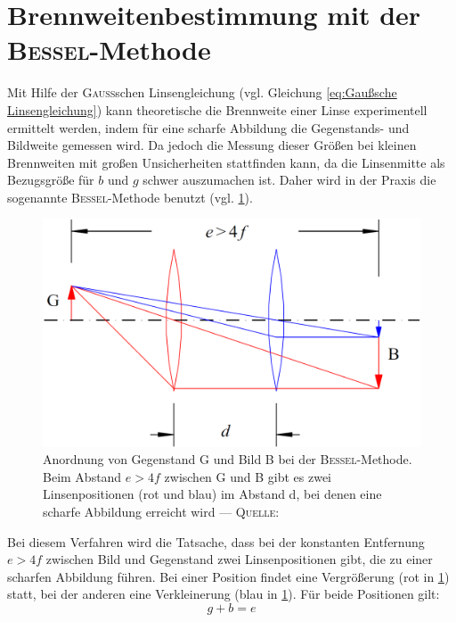 \documentclass[../protokoll.tex]{subfiles}
\begin{document}
\section{Brennweitenbestimmung mit der \textsc{Bessel}-Methode}
Mit Hilfe der \textsc{Gauß}schen Linsengleichung (vgl. Gleichung \eqref{eq:Gaußsche Linsengleichung})
kann theoretische die Brennweite einer Linse experimentell
ermittelt werden, indem für eine scharfe Abbildung die Gegenstands- und Bildweite
gemessen wird. Da jedoch die Messung dieser Größen bei kleinen Brennweiten
mit großen Unsicherheiten stattfinden kann, da die Linsenmitte als Bezugsgröße
für $b$ und $g$ schwer auszumachen ist. Daher wird in der Praxis die sogenannte
\textsc{Bessel}-Methode benutzt (vgl. \cref{fig:Bessel-Methode-Aufbau}).

\begin{figure}[H]
    \centering
    \includegraphics[width=0.3\linewidth]{2023-05-08 - V4 - Geometrische Optik, optische Abbildung und Aberrationen/images/theory/bessel-aufbau.png}
    \caption{Anordnung von Gegenstand G und Bild B bei der \textsc{Bessel}-Methode. Beim Abstand $e > 4f$ zwischen G und B gibt es zwei Linsenpositionen (rot und blau) im Abstand d, bei denen eine scharfe Abbildung erreicht wird --- \textsc{Quelle:} \cite[S. 45 -- Abb. 4]{script}}
    \label{fig:Bessel-Methode-Aufbau}
\end{figure}

Bei diesem Verfahren wird die Tatsache, dass bei der konstanten Entfernung $e > 4f$
zwischen Bild und Gegenstand zwei Linsenpositionen gibt, die zu einer scharfen Abbildung führen.
Bei einer Position findet eine Vergrößerung (rot in \cref{fig:Bessel-Methode-Aufbau}) statt, bei
der anderen eine Verkleinerung (blau in \cref{fig:Bessel-Methode-Aufbau}). Für beide
Positionen gilt:
\begin{equation}\label{eq:bessel-1}
    g + b = e
\end{equation}
\end{document}
